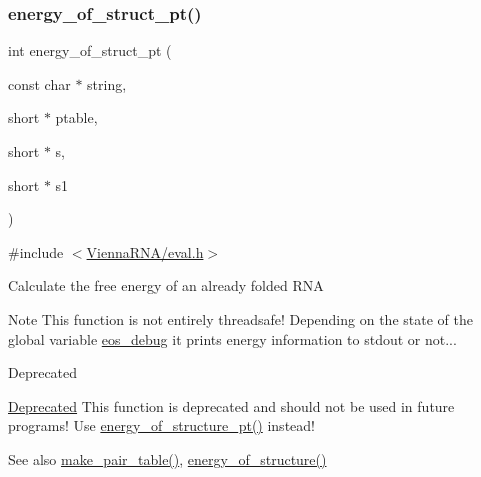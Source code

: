\subsubsection{\texorpdfstring{energy\_of\_struct\_pt()}{energy\_of\_struct\_pt()}}
{\footnotesize\ttfamily int energy\+\_\+of\+\_\+struct\+\_\+pt (\begin{DoxyParamCaption}\item[{const char $\ast$}]{string,  }\item[{short $\ast$}]{ptable,  }\item[{short $\ast$}]{s,  }\item[{short $\ast$}]{s1 }\end{DoxyParamCaption})}



{\ttfamily \#include $<$\mbox{\hyperlink{eval_8h}{Vienna\+R\+N\+A/eval.\+h}}$>$}

Calculate the free energy of an already folded R\+NA

\begin{DoxyNote}{Note}
This function is not entirely threadsafe! Depending on the state of the global variable \mbox{\hyperlink{group__eval__deprecated_ga567530678f6260a1a649a5beca5da4c5}{eos\+\_\+debug}} it prints energy information to stdout or not...~\newline
 
\end{DoxyNote}
\begin{DoxyRefDesc}{Deprecated}
\item[\mbox{\hyperlink{deprecated__deprecated000059}{Deprecated}}]This function is deprecated and should not be used in future programs! Use \mbox{\hyperlink{group__eval__deprecated_ga8831445966b761417e713360791299d8}{energy\+\_\+of\+\_\+structure\+\_\+pt()}} instead!\end{DoxyRefDesc}


\begin{DoxySeeAlso}{See also}
\mbox{\hyperlink{group__struct__utils__deprecated_ga89c32307ee50a0026f4a3131fac0845a}{make\+\_\+pair\+\_\+table()}}, \mbox{\hyperlink{group__eval__deprecated_gaf93986cb3cb29770ec9cca69c9fab8cf}{energy\+\_\+of\+\_\+structure()}} 
\end{DoxySeeAlso}

